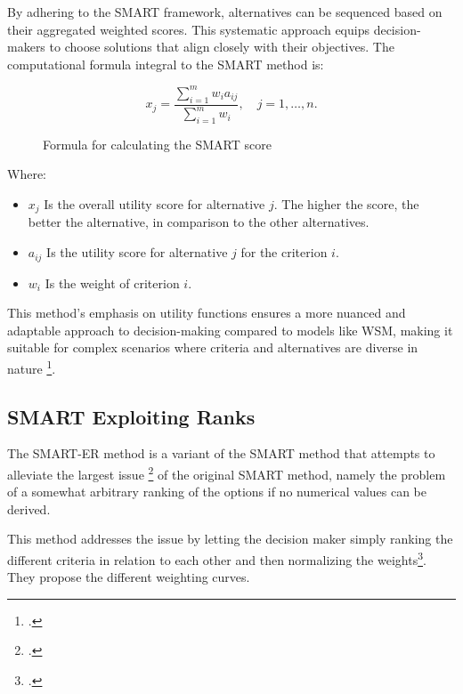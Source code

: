 By adhering to the \ac{SMART} framework, alternatives can be sequenced based on
their aggregated weighted scores. This systematic approach equips
decision-makers to choose solutions that align closely with their objectives.
The computational formula integral to the \ac{SMART} method is:


\begin{figure}[h]
    \centering
    \Large
    \[ x_j = \frac{\sum_{i=1}^{m} w_i a_{ij}}{\sum_{i=1}^{m} w_i}, \quad j = 1, \ldots, n. \]
    \caption{Formula for calculating the \ac*{SMART} score\protect\footnotemark} 
\end{figure}


Where:
\begin{itemize}
    \item \( x_j \) Is the overall utility score for alternative \( j \). The higher the score, the better the alternative, in comparison to the other alternatives.
    \item \( a_{ij} \)  Is the utility score for alternative \( j \) for the criterion \( i \).
    \item \( w_i \) Is the weight of criterion \( i \).
\end{itemize}

This method's emphasis on utility functions ensures a more nuanced and adaptable
approach to decision-making compared to models like WSM, making it suitable for
complex scenarios where criteria and alternatives are diverse in nature \footcite[p. 6]{fulopIntroductionDecisionMaking2005}.

\subsection{SMART Exploiting Ranks}
\label{smart_er}

The \ac{SMART-ER} method is a variant of the \ac{SMART} method that attempts to alleviate the largest issue \footcitetext[p. 26]{barfodMulticriteriaDecisionAnalysis2014} of the original \ac{SMART} method, 
namely the problem of a somewhat arbitrary ranking of the options if no numerical values can be derived.

This method addresses the issue by letting the decision maker simply ranking the different criteria in relation to each other and then normalizing the weights\footcite[p. 296]{robertsWeightApproximationsMultiattribute2002a}.
They propose the different weighting curves.

